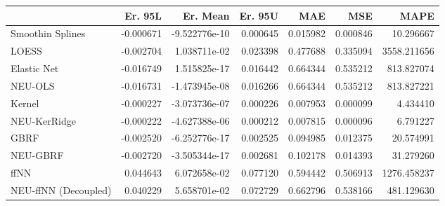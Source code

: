 \begin{tabular}{lrrrrrr}
\toprule
{} &   Er. 95L &      Er. Mean &   Er. 95U &       MAE &       MSE &         MAPE \\
\midrule
Smoothin Splines     & -0.000671 & -9.522776e-10 &  0.000645 &  0.015982 &  0.000846 &    10.296667 \\
LOESS                & -0.002704 &  1.038711e-02 &  0.023398 &  0.477688 &  0.335094 &  3558.211656 \\
Elastic Net          & -0.016749 &  1.515825e-17 &  0.016442 &  0.664344 &  0.535212 &   813.827074 \\
NEU-OLS              & -0.016731 & -1.473945e-08 &  0.016266 &  0.664344 &  0.535212 &   813.827221 \\
Kernel               & -0.000227 & -3.073736e-07 &  0.000226 &  0.007953 &  0.000099 &     4.434410 \\
NEU-KerRidge         & -0.000222 & -4.627388e-06 &  0.000212 &  0.007815 &  0.000096 &     6.791227 \\
GBRF                 & -0.002520 & -6.252776e-17 &  0.002525 &  0.094985 &  0.012375 &    20.574991 \\
NEU-GBRF             & -0.002720 & -3.505344e-17 &  0.002681 &  0.102178 &  0.014393 &    31.279260 \\
ffNN                 &  0.044643 &  6.072658e-02 &  0.077120 &  0.594442 &  0.506913 &  1276.458237 \\
NEU-ffNN (Decoupled) &  0.040229 &  5.658701e-02 &  0.072729 &  0.662796 &  0.538166 &   481.129630 \\
\bottomrule
\end{tabular}
